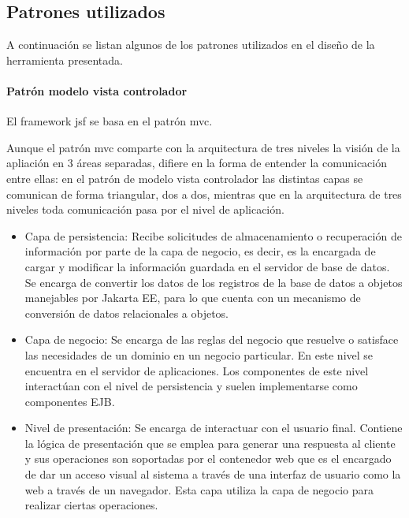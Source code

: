 \subsection{Patrones utilizados}
\label{sub:patrones}

A continuación se listan algunos de los patrones utilizados en el diseño de la herramienta presentada.



\paragraph{Patrón modelo vista controlador}
El framework \acrshort{jsf} se basa en el patrón \acrlong{mvc}.

Aunque el patrón \acrshort{mvc} comparte con la arquitectura de tres niveles la visión de la apliación en 3 áreas separadas, difiere en la forma de entender la comunicación entre ellas: en el patrón de modelo vista controlador las distintas capas se comunican de forma triangular, dos a dos, mientras que en la arquitectura de tres niveles toda comunicación pasa por el nivel de aplicación.


\begin{itemize}
\item Capa de persistencia: Recibe solicitudes de almacenamiento o recuperación de información por parte de la capa de negocio, es decir, es la encargada de cargar y modificar la información guardada en el servidor de base de datos. Se encarga de convertir los datos de los registros de la base de datos a objetos manejables por Jakarta EE, para lo que cuenta con un mecanismo de conversión de datos relacionales a objetos. 
\item Capa de negocio: Se encarga de las reglas del negocio que resuelve o satisface las necesidades de un dominio en un negocio particular. En este nivel se encuentra en el servidor de aplicaciones. Los componentes de este nivel interactúan con el nivel de persistencia y suelen implementarse como componentes EJB.
\item Nivel de presentación: Se encarga de interactuar con el usuario final. Contiene la lógica de presentación que se emplea para generar una respuesta al cliente y sus operaciones son soportadas por el contenedor web que es el encargado de dar un acceso visual al sistema a través de una interfaz de usuario como la web a través de un navegador. Esta capa utiliza la capa de negocio para realizar ciertas operaciones.
\end{itemize}


